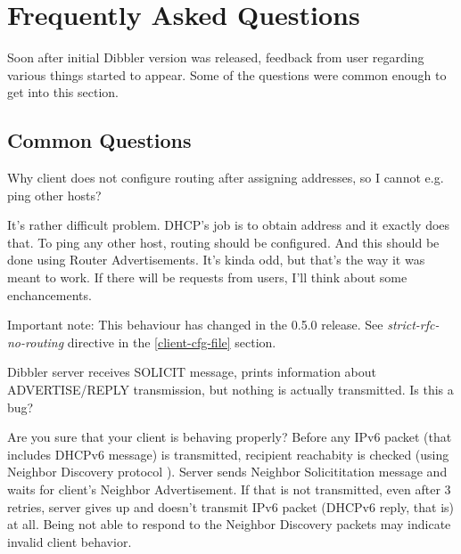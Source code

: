 

\section{Frequently Asked Questions}

Soon after initial Dibbler version was released, feedback from user
regarding various things started to appear. Some of the questions were
common enough to get into this section.

\subsection{Common Questions}

\Q Why client does not configure routing after assigning addresses, so
I cannot e.g. ping other hosts?

\A It's rather difficult problem. DHCP's job is to obtain address and
it exactly does that. To ping any other host, routing should be 
configured. And this should be done using Router Advertisements. It's
kinda odd, but that's the way it was meant to work. If there will be
requests from users, I'll think about some enchancements.

Important note: This behaviour has changed in the 0.5.0 release. See
\emph{strict-rfc-no-routing} directive in the \ref{client-cfg-file}
section. 

\Q Dibbler server receives SOLICIT message, prints information about
ADVERTISE/REPLY transmission, but nothing is actually transmitted. Is
this a bug?

\A Are you sure that your client is behaving properly? Before any IPv6
packet (that includes DHCPv6 message) is transmitted, recipient
reachabity is checked (using Neighbor Discovery protocol 
\cite{rfc2461}). Server sends Neighbor Solicititation message and
waits for client's Neighbor Advertisement. If that is not transmitted,
even after 3 retries, server gives up and doesn't transmit IPv6 packet
(DHCPv6 reply, that is) at all. Being not able to respond to the
Neighbor Discovery packets may indicate invalid client behavior. 


